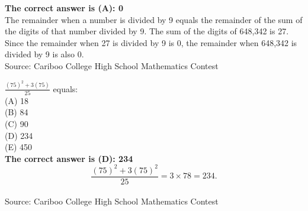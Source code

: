 \documentclass{article}
\begin{document}

\textbf{The correct answer is (A): 0}\\
The remainder when a number is divided by 9 equals the remainder of the sum of the digits of that number divided by 9. The sum of the digits of 648,342 is 27. Since the remainder when 27 is divided by 9 is 0, the remainder when 648,342 is divided by 9 is also 0.
\\[5 ex]

\scriptsize
Source: Cariboo College High School Mathematics Contest

\normalsize
$\frac{(75)^2+3(75)}{25}$ equals:\\
(A) 18\\
(B) 84\\
(C) 90\\
(D) 234\\
(E) 450\\


\textbf{The correct answer is (D): 234}\\[1 ex]
\begin{equation*}
\frac{(75)^{2}+3(75)^{2}}{25}=3\times78=234.
\end{equation*}
\\[5 ex]

\scriptsize
Source: Cariboo College High School Mathematics Contest
\end{document}

